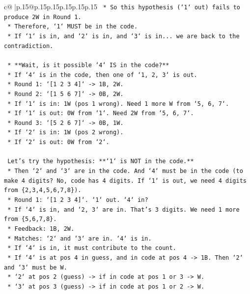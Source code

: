\documentclass{article}
\begin{document}
{\begin{supertabular}{c@{$\;$}|p{.15\linewidth}@{}p{.15\linewidth}p{.15\linewidth}p{.15\linewidth}p{.15\linewidth}p{.15\linewidth}}
{{{\texttt{                *   So this hypothesis (`1` out) fails to produce 2W in Round 1.} \\
\texttt{        *   Therefore, `1` MUST be in the code.} \\
\texttt{        *   If `1` is in, and `2` is in, and `3` is in... we are back to the contradiction.} \\
\\ 
\texttt{    *   **Wait, is it possible `4` IS in the code?**} \\
\texttt{        *   If `4` is in the code, then one of `1, 2, 3` is out.} \\
\texttt{        *   Round 1: `{[}1 2 3 4{]}` {-}> 1B, 2W.} \\
\texttt{        *   Round 2: `{[}1 5 6 7{]}` {-}> 0B, 2W.} \\
\texttt{            *   If `1` is in: 1W (pos 1 wrong). Need 1 more W from `5, 6, 7`.} \\
\texttt{            *   If `1` is out: 0W from `1`. Need 2W from `5, 6, 7`.} \\
\texttt{        *   Round 3: `{[}5 2 6 7{]}` {-}> 0B, 1W.} \\
\texttt{            *   If `2` is in: 1W (pos 2 wrong).} \\
\texttt{            *   If `2` is out: 0W from `2`.} \\
\\ 
\texttt{    Let's try the hypothesis: **`1` is NOT in the code.**} \\
\texttt{    *   Then `2` and `3` are in the code. And `4` must be in the code (to make 4 digits? No, code has 4 digits. If `1` is out, we need 4 digits from \{2,3,4,5,6,7,8\}).} \\
\texttt{    *   Round 1: `{[}1 2 3 4{]}`. `1` out. `4` in?} \\
\texttt{        *   If `4` is in, and `2, 3` are in. That's 3 digits. We need 1 more from \{5,6,7,8\}.} \\
\texttt{        *   Feedback: 1B, 2W.} \\
\texttt{        *   Matches: `2` and `3` are in. `4` is in.} \\
\texttt{        *   If `4` is in, it must contribute to the count.} \\
\texttt{        *   If `4` is at pos 4 in guess, and in code at pos 4 {-}> 1B. Then `2` and `3` must be W.} \\
\texttt{            *   `2` at pos 2 (guess) {-}> if in code at pos 1 or 3 {-}> W.} \\
\texttt{            *   `3` at pos 3 (guess) {-}> if in code at pos 1 or 2 {-}> W.} \\
}}}
\end{supertabular}}
\end{document}

